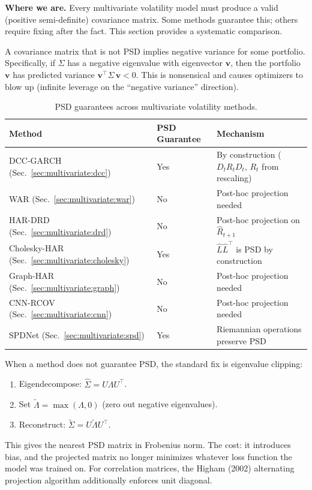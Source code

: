 \textbf{Where we are.}  Every multivariate volatility model must produce a
valid (positive semi-definite) covariance matrix. Some methods guarantee this;
others require fixing after the fact. This section provides a systematic
comparison.

\begin{intuition}
A covariance matrix that is not PSD implies negative variance for some portfolio.
Specifically, if $\Sigma$ has a negative eigenvalue with eigenvector
$\mathbf{v}$, then the portfolio $\mathbf{v}$ has predicted variance
$\mathbf{v}^\top \Sigma\, \mathbf{v} < 0$. This is nonsensical and causes
optimizers to blow up (infinite leverage on the ``negative variance'' direction).
\end{intuition}

\begin{table}[ht]
\centering
\caption{PSD guarantees across multivariate volatility methods.}
\label{tab:psd}
\begin{tabular}{lll}
\toprule
\textbf{Method} & \textbf{PSD Guarantee} & \textbf{Mechanism} \\
\midrule
DCC-GARCH (Sec.~\ref{sec:multivariate:dcc})
  & Yes & By construction ($D_t R_t D_t$, $R_t$ from rescaling) \\
WAR (Sec.~\ref{sec:multivariate:war})
  & No  & Post-hoc projection needed \\
HAR-DRD (Sec.~\ref{sec:multivariate:drd})
  & No  & Post-hoc projection on $\hat{R}_{t+1}$ \\
Cholesky-HAR (Sec.~\ref{sec:multivariate:cholesky})
  & Yes & $\hat{L}\hat{L}^\top$ is PSD by construction \\
Graph-HAR (Sec.~\ref{sec:multivariate:graph})
  & No  & Post-hoc projection needed \\
CNN-RCOV (Sec.~\ref{sec:multivariate:cnn})
  & No  & Post-hoc projection needed \\
SPDNet (Sec.~\ref{sec:multivariate:spd})
  & Yes & Riemannian operations preserve PSD \\
\bottomrule
\end{tabular}
\end{table}

\begin{keyidea}
When a method does not guarantee PSD, the standard fix is eigenvalue clipping:
\begin{enumerate}[nosep]
  \item Eigendecompose: $\hat{\Sigma} = U\Lambda U^\top$.
  \item Set $\tilde{\Lambda} = \max(\Lambda, 0)$ (zero out negative
        eigenvalues).
  \item Reconstruct: $\tilde{\Sigma} = U\tilde{\Lambda} U^\top$.
\end{enumerate}
This gives the nearest PSD matrix in Frobenius norm. The cost: it introduces
bias, and the projected matrix no longer minimizes whatever loss function the
model was trained on. For correlation matrices, the Higham (2002) alternating
projection algorithm additionally enforces unit diagonal.
\end{keyidea}

